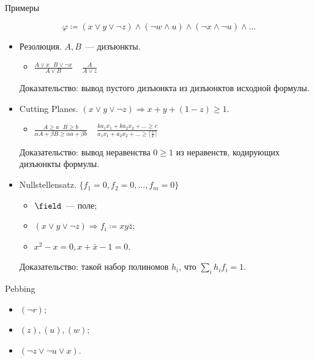 \begin{frame}{Примеры}

    $$
        \varphi \coloneqq (x \lor y \lor \neg z) \land (\neg w \land u) \land (\neg x \land \neg u) \land
        \dots
    $$

    \pause
    \begin{itemize}
        \item Резолюция. $A, B$~--- дизъюнкты.
            \begin{itemize}
                \item $\frac{A \lor x ~~~ B \lor \neg x}{A \lor B} ~~~~~ \frac{A}{A \lor z}$
            \end{itemize}
            Доказательство: вывод пустого дизъюнкта из дизъюнктов исходной формулы.
        \pause
        \item Cutting Planes. $(x \lor y \lor \neg z) \Rightarrow x + y + (1 - z) \ge 1$.
            \begin{itemize}
                \item $\frac{A \ge a ~~~ B \ge b}{\alpha A + \beta B \ge \alpha a + \beta b} ~~~~~
                    \frac{ka_1 x_1 + ka_2 x_2 + \dots \ge c}{a_1 x_1 + a_2 x_2 + \dots \ge \lceil
                    \frac{c}{k} \rceil}$
            \end{itemize}
            Доказательство: вывод неравенства $0 \ge 1$ из неравенств, кодирующих дизъюнкты формулы.
        \pause
        \item Nullstellensatz. $\{f_1 = 0, f_2 = 0, \dots, f_{m} = 0\}$
            \begin{itemize}
                \item $\field$~--- поле;
                \item $(x \lor y \lor \neg z) \Rightarrow f_i \coloneqq x y \bar{z}$;
                \item $x^2 - x = 0, x + \bar{x} - 1 = 0$.
            \end{itemize}
            Доказательство: такой набор полиномов $h_i$, что $\sum\limits_{i} h_i f_i = 1$.
    \end{itemize}

\end{frame}

\begin{frame}{Pebbing}

    \begin{center}
                
    \end{center}

    \pause
    \begin{itemize}
        \item $(\neg r)$;
            \pause
        \item $(z), (u), (w)$;
            \pause
        \item $(\neg z \lor \neg u \lor x)$.    
    \end{itemize}

    \pause
    
\end{frame}